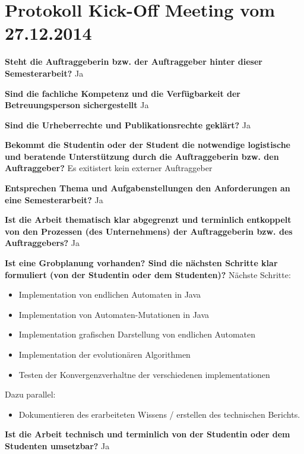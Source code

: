 \section{Protokoll Kick-Off Meeting vom 27.12.2014}
\textbf{Steht die Auftraggeberin bzw. der Auftraggeber hinter dieser Semesterarbeit?}\newline 
Ja

\textbf{Sind die fachliche Kompetenz und die Verfügbarkeit der Betreuungsperson sichergestellt}\newline 
Ja

\textbf{Sind die Urheberrechte und Publikationsrechte geklärt?}\newline 
Ja

\textbf{Bekommt die Studentin oder der Student die notwendige logistische und beratende Unterstützung durch die Auftraggeberin bzw. den Auftraggeber?}\newline 
Es exitistert kein externer Auftraggeber

\textbf{Entsprechen Thema und Aufgabenstellungen den Anforderungen an eine Semesterarbeit?}\newline 
Ja

\textbf{Ist die Arbeit thematisch klar abgegrenzt und terminlich entkoppelt von den Prozessen (des Unternehmens) der Auftraggeberin bzw. des Auftraggebers?}\newline 
Ja

\textbf{Ist eine Grobplanung vorhanden? Sind die nächsten Schritte klar formuliert (von der Studentin oder dem Studenten)?}\newline 
Nächste Schritte:\\
\begin{itemize}
	\item Implementation von endlichen Automaten in Java
	\item Implementation von Automaten-Mutationen in Java
	\item Implementation grafischen Darstellung von endlichen Automaten
	\item Implementation der evolutionären Algorithmen
	\item Testen der Konvergenzverhaltne der verschiedenen implementationen
\end{itemize}

Dazu parallel:\\
\begin{itemize}
	\item Dokumentieren des erarbeiteten Wissens / erstellen des technischen Berichts.
\end{itemize}

\textbf{Ist die Arbeit technisch und terminlich von der Studentin oder dem Studenten umsetzbar?}\newline 
Ja